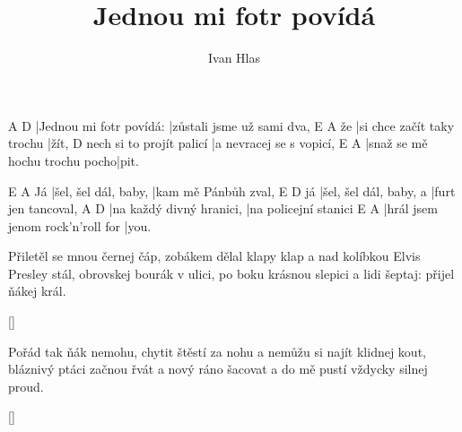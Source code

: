 \documentclass{song}
\title{Jednou mi fotr povídá}
\author{Ivan Hlas}
\begin{document}
\strophe
A\7                     D\7
|Jednou mi fotr povídá: |zůstali jsme už sami dva,
   E\7                        A\7
že |si chce začít taky trochu |žít,
                         D\7
nech si to projít palicí |a nevracej se s vopicí,
E\7                           A\7
|snaž se mě hochu trochu pocho|pit.
\endstrophe

   E\7                  A\7
Já |šel, šel dál, baby, |kam mě Pánbůh zval,
   E\7                    D\7
já |šel, šel dál, baby, a |furt jen tancoval,
A\7                      D\7
|na každý divný hranici, |na policejní stanici
E\7                              A\7
|hrál jsem jenom rock'n'roll for |you.
\endstrophe

\strophe*
Přiletěl se mnou černej čáp, zobákem dělal klapy klap
a nad kolíbkou Elvis Presley stál,
obrovskej bourák v ulici, po boku krásnou slepici
a lidi šeptaj: přijel ňákej král.
\endstrophe

\ref{}

\strophe*
Pořád tak ňák nemohu, chytit štěstí za nohu
a nemůžu si najít klidnej kout,
bláznivý ptáci začnou řvát a nový ráno šacovat
a do mě pustí vždycky silnej proud.
\endstrophe

\ref{}
\end{document}
